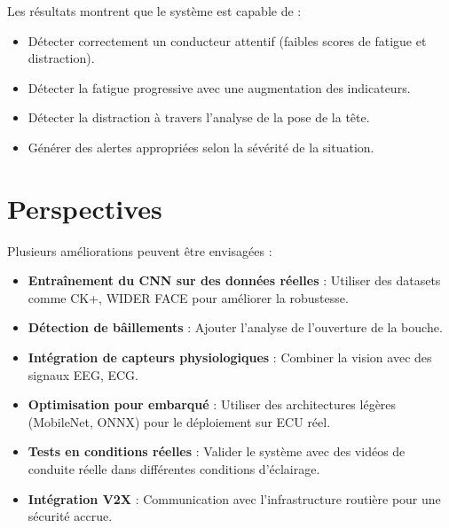 \documentclass[12pt,a4paper]{report}
\begin{document}
Les résultats montrent que le système est capable de :
\begin{itemize}
    \item Détecter correctement un conducteur attentif (faibles scores de fatigue et distraction).
    \item Détecter la fatigue progressive avec une augmentation des indicateurs.
    \item Détecter la distraction à travers l'analyse de la pose de la tête.
    \item Générer des alertes appropriées selon la sévérité de la situation.
\end{itemize}

\section{Perspectives}

Plusieurs améliorations peuvent être envisagées :

\begin{itemize}
    \item \textbf{Entraînement du CNN sur des données réelles} : Utiliser des datasets comme CK+, WIDER FACE pour améliorer la robustesse.
    \item \textbf{Détection de bâillements} : Ajouter l'analyse de l'ouverture de la bouche.
    \item \textbf{Intégration de capteurs physiologiques} : Combiner la vision avec des signaux EEG, ECG.
    \item \textbf{Optimisation pour embarqué} : Utiliser des architectures légères (MobileNet, ONNX) pour le déploiement sur ECU réel.
    \item \textbf{Tests en conditions réelles} : Valider le système avec des vidéos de conduite réelle dans différentes conditions d'éclairage.
    \item \textbf{Intégration V2X} : Communication avec l'infrastructure routière pour une sécurité accrue.
\end{itemize}
\end{document}
